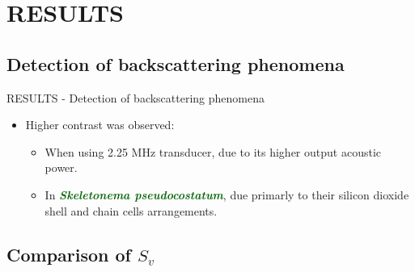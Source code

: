 \documentclass[handout]{beamer}
\newcommand\Fontable{\fontsize{9}{10}\selectfont}
\begin{document}
\section{RESULTS}
\subsection{Detection of backscattering phenomena}

\begin{frame}{RESULTS - Detection of backscattering phenomena}
\Fontable
{}

\vspace{1pc}
\centering
{}

\begin{itemize}
\item<3-> Higher contrast was observed:
\begin{itemize}
\Fontable
\item<3-> When using 2.25 MHz transducer, due to its higher output acoustic power.
\item<3-> In \textcolor{darkgreen}{{\bf \textit{Skeletonema pseudocostatum}}}, due primarly to their silicon dioxide shell and chain cells arrangements.
\end{itemize}
\end{itemize}

\end{frame}

\subsection{Comparison of $S_v$}
\end{document}
